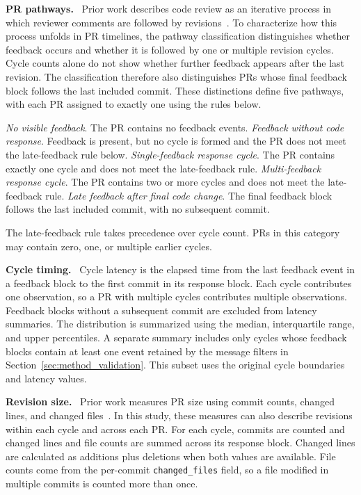 \documentclass[10pt,conference,anonymous]{IEEEtran}
\newcommand{\runinhead}[1]{\noindent\textbf{#1.}\ }
\begin{document}
\runinhead{PR pathways}
Prior work describes code review as an iterative process in which reviewer comments are followed by revisions~\cite{sadowskiModernCodeReview2018}.
To characterize how this process unfolds in PR timelines, the pathway classification distinguishes whether feedback occurs and whether it is followed by one or multiple revision cycles.
Cycle counts alone do not show whether further feedback appears after the last revision.
The classification therefore also distinguishes PRs whose final feedback block follows the last included commit.
These distinctions define five pathways, with each PR assigned to exactly one using the rules below.

\textit{No visible feedback}. The PR contains no feedback events.
\textit{Feedback without code response}. Feedback is present, but no cycle is formed and the PR does not meet the late-feedback rule below.
\textit{Single-feedback response cycle}. The PR contains exactly one cycle and does not meet the late-feedback rule.
\textit{Multi-feedback response cycle}. The PR contains two or more cycles and does not meet the late-feedback rule.
\textit{Late feedback after final code change}. The final feedback block follows the last included commit, with no subsequent commit.

The late-feedback rule takes precedence over cycle count.
PRs in this category may contain zero, one, or multiple earlier cycles.

\runinhead{Cycle timing}
Cycle latency is the elapsed time from the last feedback event in a feedback block to the first commit in its response block.
Each cycle contributes one observation, so a PR with multiple cycles contributes multiple observations.
Feedback blocks without a subsequent commit are excluded from latency summaries.
The distribution is summarized using the median, interquartile range, and upper percentiles.
A separate summary includes only cycles whose feedback blocks contain at least one event retained by the message filters in Section~\ref{sec:method_validation}.
This subset uses the original cycle boundaries and latency values.

\runinhead{Revision size}
Prior work measures PR size using commit counts, changed lines, and changed files~\cite{gousiosExploratoryPullBased2014}.
In this study, these measures can also describe revisions within each cycle and across each PR.
For each cycle, commits are counted and changed lines and file counts are summed across its response block.
Changed lines are calculated as additions plus deletions when both values are available.
File counts come from the per-commit \texttt{changed\_files} field, so a file modified in multiple commits is counted more than once.
\end{document}
